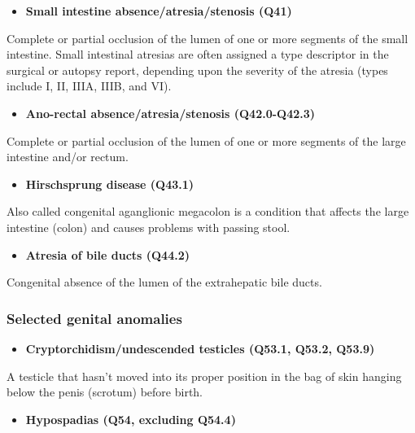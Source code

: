 \documentclass[
]{krantz}
\providecommand{\tightlist}{%
  \setlength{\itemsep}{0pt}\setlength{\parskip}{0pt}}
\begin{document}
\begin{itemize}
\tightlist
\item
  \textbf{Small intestine absence/atresia/stenosis (Q41)}
\end{itemize}

Complete or partial occlusion of the lumen of one or more segments of the small intestine. Small intestinal atresias are often assigned a type descriptor in the surgical or autopsy report, depending upon the severity of the atresia (types include I, II, IIIA, IIIB, and VI).

\begin{itemize}
\tightlist
\item
  \textbf{Ano-rectal absence/atresia/stenosis (Q42.0-Q42.3)}
\end{itemize}

Complete or partial occlusion of the lumen of one or more segments of the large intestine and/or rectum.

\begin{itemize}
\tightlist
\item
  \textbf{Hirschsprung disease (Q43.1)}
\end{itemize}

Also called congenital aganglionic megacolon is a condition that affects the large intestine (colon) and causes problems with passing stool.

\begin{itemize}
\tightlist
\item
  \textbf{Atresia of bile ducts (Q44.2)}
\end{itemize}

Congenital absence of the lumen of the extrahepatic bile ducts.

\hypertarget{section2117}{%
\subsubsection{Selected genital anomalies}\label{section2117}}

\begin{itemize}
\tightlist
\item
  \textbf{Cryptorchidism/undescended testicles (Q53.1, Q53.2, Q53.9)}
\end{itemize}

A testicle that hasn't moved into its proper position in the bag of skin hanging below the penis (scrotum) before birth.

\begin{itemize}
\tightlist
\item
  \textbf{Hypospadias (Q54, excluding Q54.4)}
\end{itemize}
\end{document}
